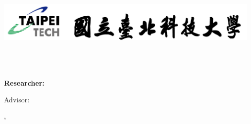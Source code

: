 \begin{titlepage}
    \newpage
    \begin{center}
        \includegraphics[width=13cm]{ntut-logo-with-label.png}
        
        \huge\bf\fulldeptEname \\%
        \huge\bf\degreeEname\\ %

        \vfill
        \LARGE\bf\eTitle\\ %

        \vfill
        {\Large Researcher: \myEname}

        \vfill
        {\Large Advisor: \advisorEname}

        \vfill
        {\Large \eMonth, \eYear}
    \end{center}
\end{titlepage}